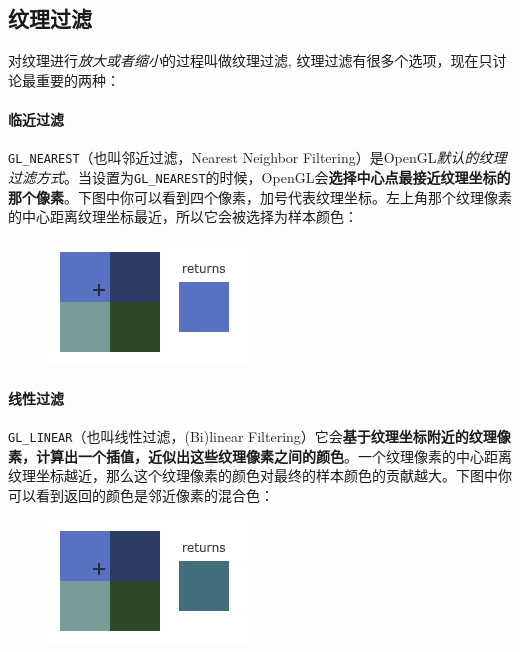 \documentclass[UTF8,a4paper,12pt]{ctexbook}
\begin{document}
		
		\subsection{纹理过滤}
			对纹理进行\textit{放大或者缩小}的过程叫做纹理过滤, 纹理过滤有很多个选项，现在只讨论最重要的两种：
			
			\paragraph{临近过滤}
				\verb|GL_NEAREST|（也叫邻近过滤，Nearest Neighbor Filtering）是OpenGL\textit{默认的纹理过滤方式}。当设置为\verb|GL_NEAREST|的时候，OpenGL会\textbf{选择中心点最接近纹理坐标的那个像素}。下图中你可以看到四个像素，加号代表纹理坐标。左上角那个纹理像素的中心距离纹理坐标最近，所以它会被选择为样本颜色：
				
				\begin{figure}[H]
					\centering
					\includegraphics[width=.5\linewidth]{filter_nearest}
				\end{figure}
			
			\paragraph{线性过滤}
				\verb|GL_LINEAR|（也叫线性过滤，(Bi)linear Filtering）它会\textbf{基于纹理坐标附近的纹理像素，计算出一个插值，近似出这些纹理像素之间的颜色}。一个纹理像素的中心距离纹理坐标越近，那么这个纹理像素的颜色对最终的样本颜色的贡献越大。下图中你可以看到返回的颜色是邻近像素的混合色：
				\begin{figure}[H]
					\centering
					\includegraphics[width=.5\linewidth]{filter_linear}
				\end{figure}			
		
\end{document}
